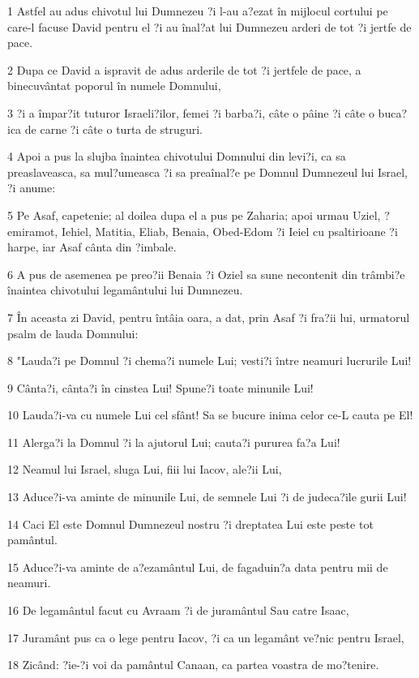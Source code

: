 \par 1 Astfel au adus chivotul lui Dumnezeu ?i l-au a?ezat în mijlocul cortului pe care-l facuse David pentru el ?i au înal?at lui Dumnezeu arderi de tot ?i jertfe de pace.
\par 2 Dupa ce David a ispravit de adus arderile de tot ?i jertfele de pace, a binecuvântat poporul în numele Domnului,
\par 3 ?i a împar?it tuturor Israeli?ilor, femei ?i barba?i, câte o pâine ?i câte o buca?ica de carne ?i câte o turta de struguri.
\par 4 Apoi a pus la slujba înaintea chivotului Domnului din levi?i, ca sa preaslaveasca, sa mul?umeasca ?i sa preaînal?e pe Domnul Dumnezeul lui Israel, ?i anume:
\par 5 Pe Asaf, capetenie; al doilea dupa el a pus pe Zaharia; apoi urmau Uziel, ?emiramot, Iehiel, Matitia, Eliab, Benaia, Obed-Edom ?i Ieiel cu psaltirioane ?i harpe, iar Asaf cânta din ?imbale.
\par 6 A pus de asemenea pe preo?ii Benaia ?i Oziel sa sune necontenit din trâmbi?e înaintea chivotului legamântului lui Dumnezeu.
\par 7 În aceasta zi David, pentru întâia oara, a dat, prin Asaf ?i fra?ii lui, urmatorul psalm de lauda Domnului:
\par 8 "Lauda?i pe Domnul ?i chema?i numele Lui; vesti?i între neamuri lucrurile Lui!
\par 9 Cânta?i, cânta?i în cinstea Lui! Spune?i toate minunile Lui!
\par 10 Lauda?i-va cu numele Lui cel sfânt! Sa se bucure inima celor ce-L cauta pe El!
\par 11 Alerga?i la Domnul ?i la ajutorul Lui; cauta?i pururea fa?a Lui!
\par 12 Neamul lui Israel, sluga Lui, fiii lui Iacov, ale?ii Lui,
\par 13 Aduce?i-va aminte de minunile Lui, de semnele Lui ?i de judeca?ile gurii Lui!
\par 14 Caci El este Domnul Dumnezeul nostru ?i dreptatea Lui este peste tot pamântul.
\par 15 Aduce?i-va aminte de a?ezamântul Lui, de fagaduin?a data pentru mii de neamuri.
\par 16 De legamântul facut cu Avraam ?i de juramântul Sau catre Isaac,
\par 17 Juramânt pus ca o lege pentru Iacov, ?i ca un legamânt ve?nic pentru Israel,
\par 18 Zicând: ?ie-?i voi da pamântul Canaan, ca partea voastra de mo?tenire.
